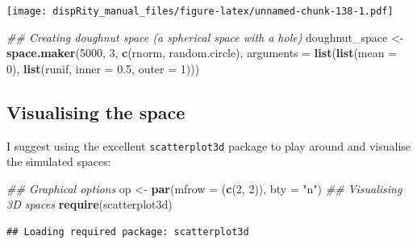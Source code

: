 \documentclass[
]{book}
\newenvironment{Shaded}{\begin{snugshade}}{\end{snugshade}}
\newcommand{\CommentTok}[1]{\textcolor[rgb]{0.56,0.35,0.01}{\textit{#1}}}
\newcommand{\DataTypeTok}[1]{\textcolor[rgb]{0.13,0.29,0.53}{#1}}
\newcommand{\DecValTok}[1]{\textcolor[rgb]{0.00,0.00,0.81}{#1}}
\newcommand{\FloatTok}[1]{\textcolor[rgb]{0.00,0.00,0.81}{#1}}
\newcommand{\KeywordTok}[1]{\textcolor[rgb]{0.13,0.29,0.53}{\textbf{#1}}}
\newcommand{\NormalTok}[1]{#1}
\newcommand{\StringTok}[1]{\textcolor[rgb]{0.31,0.60,0.02}{#1}}
\begin{document}
\texttt{[image: dispRity\_manual\_files/figure-latex/unnamed-chunk-138-1.pdf]}

\begin{Shaded}
\begin{Highlighting}[]
\CommentTok{\#\# Creating doughnut space (a spherical space with a hole)}
\NormalTok{doughnut\_space \textless{}{-}}\StringTok{ }\KeywordTok{space.maker}\NormalTok{(}\DecValTok{5000}\NormalTok{, }\DecValTok{3}\NormalTok{, }\KeywordTok{c}\NormalTok{(rnorm, random.circle),}
     \DataTypeTok{arguments =} \KeywordTok{list}\NormalTok{(}\KeywordTok{list}\NormalTok{(}\DataTypeTok{mean =} \DecValTok{0}\NormalTok{),}
                      \KeywordTok{list}\NormalTok{(runif, }\DataTypeTok{inner =} \FloatTok{0.5}\NormalTok{, }\DataTypeTok{outer =} \DecValTok{1}\NormalTok{)))}
\end{Highlighting}
\end{Shaded}

\hypertarget{visualising-the-space}{%
\subsection{Visualising the space}\label{visualising-the-space}}

I suggest using the excellent \texttt{scatterplot3d} package to play around and visualise the simulated spaces:

\begin{Shaded}
\begin{Highlighting}[]
\CommentTok{\#\# Graphical options}
\NormalTok{op \textless{}{-}}\StringTok{ }\KeywordTok{par}\NormalTok{(}\DataTypeTok{mfrow =}\NormalTok{ (}\KeywordTok{c}\NormalTok{(}\DecValTok{2}\NormalTok{, }\DecValTok{2}\NormalTok{)), }\DataTypeTok{bty =} \StringTok{"n"}\NormalTok{)}
\CommentTok{\#\# Visualising 3D spaces}
\KeywordTok{require}\NormalTok{(scatterplot3d)}
\end{Highlighting}
\end{Shaded}

\begin{verbatim}
## Loading required package: scatterplot3d
\end{verbatim}
\end{document}
